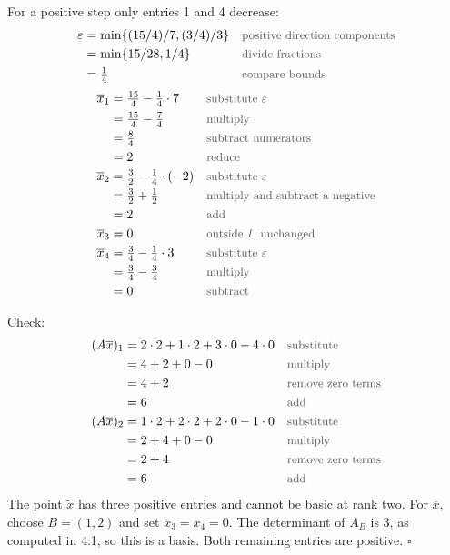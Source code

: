 \documentclass[a4paper,11pt]{article}
\newif\ifexplain
\newcommand{\why}[1]{\text{\small\color{black!65}#1}}
\newcommand{\explain}[1]{\ifexplain\begin{erklbox}#1\end{erklbox}\fi}
\begin{document}
For a positive step only entries 1 and 4 decrease:
\begin{align*}
\varepsilon&=\min\{(15/4)/7,(3/4)/3\}&&\why{positive direction components}\\
&=\min\{15/28,1/4\}&&\why{divide fractions}\\
&=\tfrac14&&\why{compare bounds}
\end{align*}
\begin{align*}
\overline x_1&=\tfrac{15}{4}-\tfrac14\cdot7&&\why{substitute $\varepsilon$}\\
&=\tfrac{15}{4}-\tfrac74&&\why{multiply}\\
&=\tfrac84&&\why{subtract numerators}\\
&=2&&\why{reduce}\\
\overline x_2&=\tfrac32-\tfrac14\cdot(-2)&&\why{substitute $\varepsilon$}\\
&=\tfrac32+\tfrac12&&\why{multiply and subtract a negative}\\
&=2&&\why{add}\\
\overline x_3&=0&&\why{outside $I$, unchanged}\\
\overline x_4&=\tfrac34-\tfrac14\cdot3&&\why{substitute $\varepsilon$}\\
&=\tfrac34-\tfrac34&&\why{multiply}\\
&=0&&\why{subtract}
\end{align*}
\explain{Die vierte Komponente wird zuerst null. Die zweite wächst, weil ihr Richtungskoeffizient negativ ist. Sie setzt daher keine obere Schranke für einen positiven Schritt. Zusammen mit der bereits vorhandenen dritten Null bleiben nur die ersten beiden Variablen positiv.}
Check:
\begin{align*}
(A\overline x)_1&=2\cdot2+1\cdot2+3\cdot0-4\cdot0&&\why{substitute}\\
&=4+2+0-0&&\why{multiply}\\
&=4+2&&\why{remove zero terms}\\
&=6&&\why{add}\\
(A\overline x)_2&=1\cdot2+2\cdot2+2\cdot0-1\cdot0&&\why{substitute}\\
&=2+4+0-0&&\why{multiply}\\
&=2+4&&\why{remove zero terms}\\
&=6&&\why{add}
\end{align*}
The point $\widetilde x$ has three positive entries and cannot be basic at rank two.
For $\overline x$, choose $B=(1,2)$ and set $x_3=x_4=0$. The determinant of $A_B$ is 3, as computed in 4.1, so this is a basis. Both remaining entries are positive. $\square$
\end{document}
